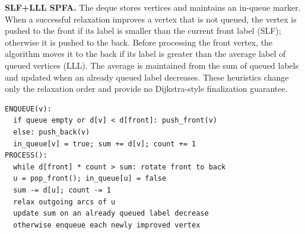 \textbf{SLF+LLL SPFA.} The deque stores vertices and maintains an in-queue marker.
When a successful relaxation improves a vertex that is not queued, the vertex is
pushed to the front if its label is smaller than the current front label (SLF);
otherwise it is pushed to the back. Before processing the front vertex, the
algorithm moves it to the back if its label is greater than the average label of
queued vertices (LLL). The average is maintained from the sum of queued labels and
updated when an already queued label decreases. These heuristics change only the
relaxation order and provide no Dijkstra-style finalization guarantee.

\begin{lstlisting}[caption={Queue scheduling rules for SLF+LLL},float=t]
ENQUEUE(v):
  if queue empty or d[v] < d[front]: push_front(v)
  else: push_back(v)
  in_queue[v] = true; sum += d[v]; count += 1
PROCESS():
  while d[front] * count > sum: rotate front to back
  u = pop_front(); in_queue[u] = false
  sum -= d[u]; count -= 1
  relax outgoing arcs of u
  update sum on an already queued label decrease
  otherwise enqueue each newly improved vertex
\end{lstlisting}
\FloatBarrier
